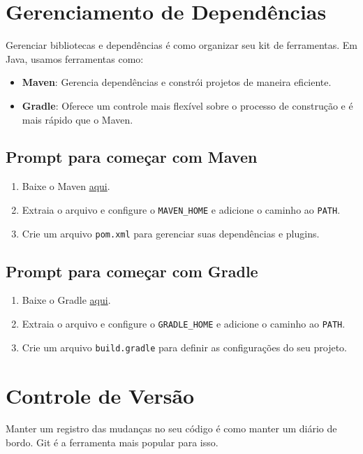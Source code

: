 \documentclass[a4paper,12pt]{book}
\begin{document}
\section{Gerenciamento de Dependências}

Gerenciar bibliotecas e dependências é como organizar seu kit de ferramentas. Em Java, usamos ferramentas como:

\begin{itemize}
    \item \textbf{Maven}: Gerencia dependências e constrói projetos de maneira eficiente.
    \item \textbf{Gradle}: Oferece um controle mais flexível sobre o processo de construção e é mais rápido que o Maven.
\end{itemize}

\subsection{Prompt para começar com Maven}
\begin{enumerate}
    \item Baixe o Maven \href{https://maven.apache.org/download.cgi}{aqui}.
    \item Extraia o arquivo e configure o \texttt{MAVEN\_HOME} e adicione o caminho ao \texttt{PATH}.
    \item Crie um arquivo \texttt{pom.xml} para gerenciar suas dependências e plugins.
\end{enumerate}

\subsection{Prompt para começar com Gradle}
\begin{enumerate}
    \item Baixe o Gradle \href{https://gradle.org/install/}{aqui}.
    \item Extraia o arquivo e configure o \texttt{GRADLE\_HOME} e adicione o caminho ao \texttt{PATH}.
    \item Crie um arquivo \texttt{build.gradle} para definir as configurações do seu projeto.
\end{enumerate}

\section{Controle de Versão}

Manter um registro das mudanças no seu código é como manter um diário de bordo. Git é a ferramenta mais popular para isso.
\end{document}
